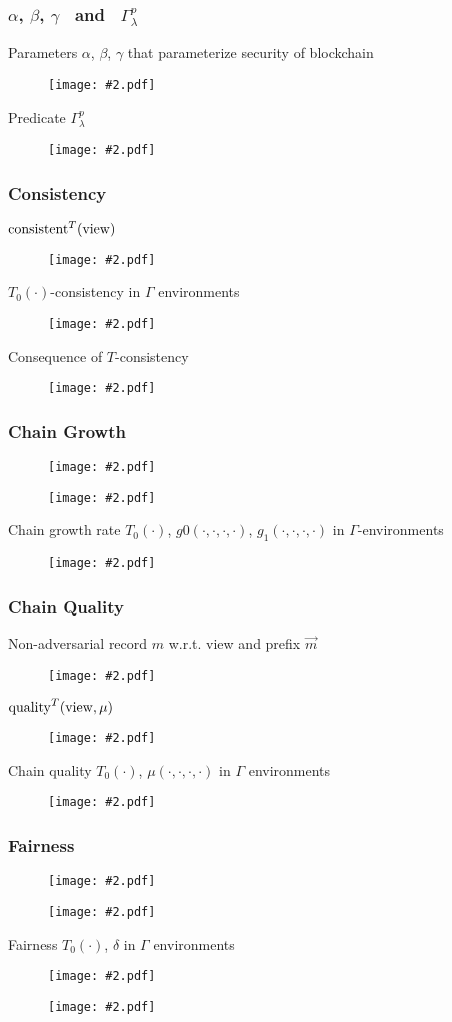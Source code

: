 \documentclass{beamer}
\newcommand{\insfig}[2][1]{
	\begin{figure}
		\texttt{[image: \#2.pdf]}
	\end{figure}
}
\newcommand{\insblk}[2]{
	\begin{block}{#1}
		\insfig{#2}
	\end{block}
}
\begin{document}
\begin{spacing}{1.2}
\begin{frame}
\end{frame}


\begin{frame}
	\frametitle{$\alpha$, $\beta$, $\gamma$ \ and \ $\Gamma_\lambda^p$}
	\insblk{Parameters $\alpha$, $\beta$, $\gamma$ that parameterize security of blockchain}{Para1}
	\vspace{20pt}
	\insblk{Predicate $\Gamma_\lambda^p$}{Para2}
\end{frame}

\begin{frame}
	\frametitle{Consistency}
	\insblk{${\rm consistent}^T({\rm view})$}{C1}
	\begin{block}{$T_0(\cdot)$-consistency in $\Gamma$ environments}
		\insfig[0.95]{C2}
	\end{block}
	\insblk{Consequence of $T$-consistency}{c3}
\end{frame}

\begin{frame}
	\frametitle{Chain Growth}
	\vspace{-5pt}
	\insfig[0.7]{CG1}
	\vspace{-10pt}
	\insfig[0.95]{CG2}
	\vspace{-10pt}
	\insblk{Chain growth rate $T_0(\cdot)$, $g0(\cdot, \cdot, \cdot, \cdot)$, $g_1(\cdot, \cdot, \cdot, \cdot)$ in $\Gamma$-environments}{CG3}
\end{frame}

\begin{frame}
	\frametitle{Chain Quality}
	\insblk{Non-adversarial record $m$ w.r.t. view and prefix $\vec{m}$}{CQ1}
	\insblk{${\rm quality}^T({\rm view},\mu)$}{CQ2}
	\insblk{Chain quality $T_0(\cdot)$, $\mu(\cdot, \cdot, \cdot, \cdot)$ in $\Gamma$ environments}{CQ3}
\end{frame}

\begin{frame}
	\frametitle{Fairness}
	\vspace{-3pt}
		\insfig{F1}
		\vspace{-10pt}
		\insfig{F2}
	\vspace{-7pt}
	\insblk{Fairness $T_0(\cdot)$, $\delta$ in $\Gamma$ environments}{F3}
	\vspace{-3pt}
	\insfig{F4}
\end{frame}


\end{spacing}
\end{document}
